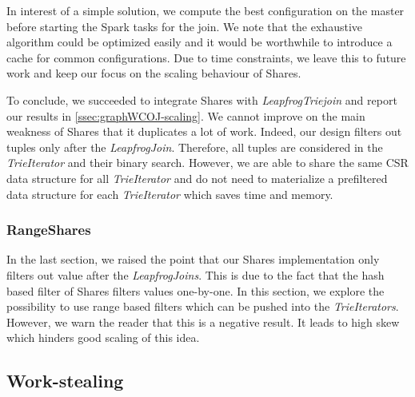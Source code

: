 In interest of a simple solution, we compute the best configuration on the master before starting the Spark
tasks for the join.
We note that the exhaustive algorithm could be optimized easily and it would be worthwhile to introduce
a cache for common configurations.
Due to time constraints, we leave this to future work and keep our focus on the scaling behaviour of Shares.

To conclude, we succeeded to integrate Shares with \textit{LeapfrogTriejoin} and report our results in \cref{ssec:graphWCOJ-scaling}.
We cannot improve on the main weakness of Shares that it duplicates a lot of work.
Indeed, our design filters out tuples only after the \textit{LeapfrogJoin}.
Therefore, all tuples are considered in the \textit{TrieIterator} and their binary search.
However, we are able to share the same CSR data structure for all \textit{TrieIterator} and do not
need to materialize a prefiltered data structure for each \textit{TrieIterator} which saves time and memory.

\subsubsection{RangeShares}
In the last section, we raised the point that our Shares implementation only filters out value after the
\textit{LeapfrogJoins}.
This is due to the fact that the hash based filter of Shares filters values one-by-one.
In this section, we explore the possibility to use range based filters which can be pushed into the \textit{TrieIterators}.
However, we warn the reader that this is a negative result.
It leads to high skew which hinders good scaling of this idea.




\subsection{Work-stealing} \label{ssec:work-stealing}
